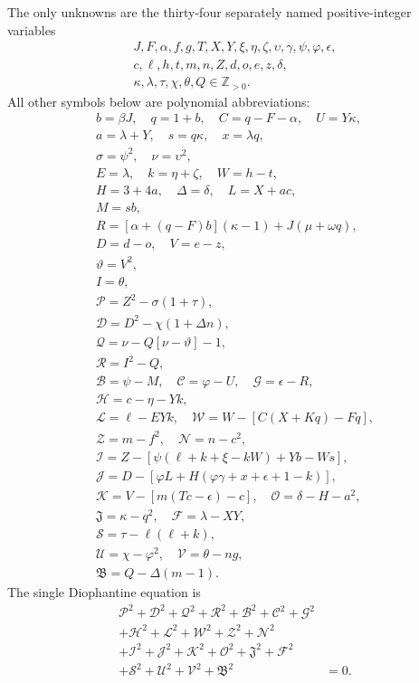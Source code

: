 The only unknowns are the thirty-four separately named positive-integer variables
\[
\begin{gathered}J,F,\alpha,f,g,T,X,Y,\xi,\eta,\zeta,\upsilon,\gamma,\psi,\varphi,\epsilon,\\
c,\ell,h,t,m,n,Z,d,o,e,z,\delta,\\
\kappa,\lambda,\tau,\chi,\theta,Q\in\mathbb Z_{>0}.\end{gathered}
\]
All other symbols below are polynomial abbreviations:
\[
\begin{gathered}
b=\beta J,\quad q=1+b,\quad C=q-F-\alpha,\quad U=Y\kappa,\\
a=\lambda+Y,\quad s=q\kappa,\quad x=\lambda q,\\
\sigma=\psi^2,\quad\nu=\upsilon^2,\\
E=\lambda,\quad k=\eta+\zeta,\quad W=h-t,\\
H=3+4a,\quad\Delta=\delta,\quad L=X+ac,\\
M=sb,\\
R=[\alpha+(q-F)b](\kappa-1)+J(\mu+\omega q),\\
D=d-o,\quad V=e-z,\\
\vartheta=V^2,\\
I=\theta,\\
\mathcal{P}=Z^2-\sigma(1+\tau),\\
\mathcal{D}=D^2-\chi(1+\Delta n),\\
\mathcal{Q}=\nu-Q[\nu-\vartheta]-1,\\
\mathcal{R}=I^2-Q,\\
\mathcal{B}=\psi-M,\quad \mathcal{C}=\varphi-U,\quad \mathcal{G}=\epsilon-R,\\
\mathcal{H}=c-\eta-Yk,\\
\mathcal{L}=\ell-EYk,\quad \mathcal{W}=W-[C(X+Kq)-Fq],\\
\mathcal{Z}=m-f^2,\quad \mathcal{N}=n-c^2,\\
\mathcal{I}=Z-[\psi(\ell+k+\xi-kW)+Yb-Ws],\\
\mathcal{J}=D-[\varphi L+H(\varphi\gamma+x+\epsilon+1-k)],\\
\mathcal{K}=V-[m(Tc-\epsilon)-c],\quad\mathcal{O}=\delta-H-a^2,\\
\mathfrak{J}=\kappa-q^2,\quad\mathcal{F}=\lambda-XY,\\
\mathcal{S}=\tau-\ell(\ell+k),\\
\mathcal{U}=\chi-\varphi^2,\quad\mathcal{V}=\theta-ng,\\
\mathfrak{B}=Q-\Delta(m-1).
\end{gathered}
\]
The single Diophantine equation is
\[
\begin{split}
\mathcal{P}^2+\mathcal{D}^2+\mathcal{Q}^2+\mathcal{R}^2+\mathcal{B}^2+\mathcal{C}^2+\mathcal{G}^2 &\\
+\mathcal{H}^2+\mathcal{L}^2+\mathcal{W}^2+\mathcal{Z}^2+\mathcal{N}^2 &\\
+\mathcal{I}^2+\mathcal{J}^2+\mathcal{K}^2+\mathcal{O}^2+\mathfrak{J}^2+\mathcal{F}^2 &\\
+\mathcal{S}^2+\mathcal{U}^2+\mathcal{V}^2+\mathfrak{B}^2 &= 0.
\end{split}
\]
